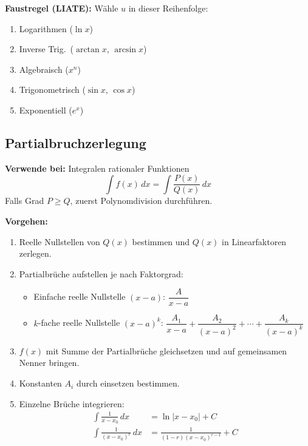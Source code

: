 \textbf{Faustregel (LIATE):} Wähle \(u\) in dieser Reihenfolge:
\begin{enumerate}
    \item[\textbf{L}] Logarithmen (\(\ln x\))
    \item[\textbf{I}] Inverse Trig.\ (\(\arctan x\), \(\arcsin x\))
    \item[\textbf{A}] Algebraisch (\(x^n\))
    \item[\textbf{T}] Trigonometrisch (\(\sin x\), \(\cos x\))
    \item[\textbf{E}] Exponentiell (\(e^x\))
\end{enumerate}

\subsection{Partialbruchzerlegung}
\textbf{Verwende bei:} Integralen rationaler Funktionen 
\[
\int f(x)\,dx = \int \frac{P(x)}{Q(x)}\,dx
\]
Falls Grad \(P \geq Q\), zuerst Polynomdivision durchführen.

\textbf{Vorgehen:}
\begin{enumerate}
    \item Reelle Nullstellen von \(Q(x)\) bestimmen und \(Q(x)\) in Linearfaktoren zerlegen.
    \item Partialbrüche aufstellen je nach Faktorgrad:
          \begin{itemize}
              \item Einfache reelle Nullstelle \((x - a)\): \(\dfrac{A}{x-a}\)
              \item \(k\)-fache reelle Nullstelle \((x-a)^k\): \(\dfrac{A_1}{x-a} + \dfrac{A_2}{(x-a)^2} + \cdots + \dfrac{A_k}{(x-a)^k}\)
          \end{itemize}
    \item \(f(x)\) mit Summe der Partialbrüche gleichsetzen und auf gemeinsamen Nenner bringen.
    \item Konstanten \(A_i\) durch einsetzen bestimmen.
    \item Einzelne Brüche integrieren:
          \begin{align*}
              \int \frac{1}{x-x_0}\,dx     & = \ln|x-x_0|+C                   \\
              \int \frac{1}{(x-x_0)^r}\,dx & = \frac{1}{(1-r)(x-x_0)^{r-1}}+C \\
          \end{align*}
\end{enumerate}
